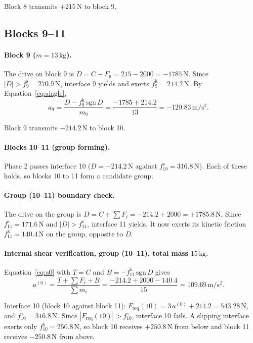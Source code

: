 \documentclass[11pt,a4paper]{article}
\begin{document}
Block 8 transmits $+215\,\mathrm{N}$ to block 9.

\subsection{Blocks 9--11}
\paragraph{Block 9 ($m=13\,\mathrm{kg}$).} The drive on block 9 is $D=C+F_{9}=215 - 2000=-1785\,\mathrm{N}$. Since $|D|>f^{\mathrm s}_{9}=270.9\,\mathrm{N}$, interface 9 yields and exerts $f^{\mathrm k}_{9}=214.2\,\mathrm{N}$. By Equation~\eqref{eq:single},\[a_{9}=\dfrac{D-f^{\mathrm k}_{9}\,\mathrm{sgn}\,D}{m_{9}}=\dfrac{-1785 + 214.2}{13}=-120.83\,\mathrm{m/s^2}.\]

Block 9 transmits $-214.2\,\mathrm{N}$ to block 10.

\paragraph{Blocks 10--11 (group forming).} Phase 2 passes interface 10 ($D=-214.2\,\mathrm{N}$ against $f^{\mathrm s}_{10}=316.8\,\mathrm{N}$). Each of these holds, so blocks 10 to 11 form a candidate group.

\paragraph{Group (10--11) boundary check.} The drive on the group is $D=C+\sum F_i=-214.2 + 2000=+1785.8\,\mathrm{N}$. Since $f^{\mathrm s}_{11}=171.6\,\mathrm{N}$ and $|D|>f^{\mathrm s}_{11}$, interface 11 yields. It now exerts its kinetic friction $f^{\mathrm k}_{11}=140.4\,\mathrm{N}$ on the group, opposite to $D$.

\paragraph{Internal shear verification, group (10--11), total mass $15\,\mathrm{kg}$.} Equation~\eqref{eq:a0} with $T=C$ and $B=-f^{\mathrm k}_{11}\,\mathrm{sgn}\,D$ gives\[a^{(0)}=\dfrac{T+\sum F_i+B}{\sum m_i}=\dfrac{-214.2 + 2000 - 140.4}{15}=109.69\,\mathrm{m/s^2}.\]

Interface 10 (block 10 against block 11): $F_{\mathrm{req}}(10)=3\,a^{(0)} + 214.2=543.28\,\mathrm{N}$, and $f^{\mathrm s}_{10}=316.8\,\mathrm{N}$. Since $|F_{\mathrm{req}}(10)|>f^{\mathrm s}_{10}$, interface 10 fails. A slipping interface exerts only $f^{\mathrm k}_{10}=250.8\,\mathrm{N}$, so block 10 receives $+250.8\,\mathrm{N}$ from below and block 11 receives $-250.8\,\mathrm{N}$ from above.
\end{document}
